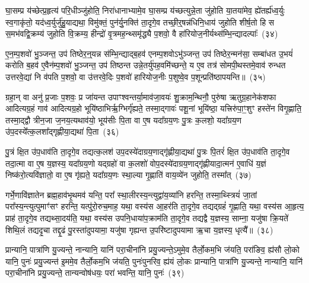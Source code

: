 घा॒सम्प्र य॑च्छेत्प्र॒हृत्य॑ परि॒धीञ्जु॑होति॒ निरा॑धानाभ्यामे॒व घा॒सम्प्र य॑च्छत्युन्ने॒ता जु॑होति या॒तया॑मेव॒ ह्ये॑तर्\mbox{}ह्य॑ध्व॒र्युः स्व॒गाकृ॑तो॒ यद॑ध्व॒र्युर्जु॑हु॒याद्यथा॒ विमु॑क्तं॒ पुन॑र्यु॒नक्ति॑ ता॒दृगे॒व तच्छी॒र्॒\mbox{}षन्न॑धिनि॒धाय॑ जुहोति शीर्\mbox{}ष॒तो हि स स॒मभ॑वद्वि॒क्रम्य॑ जुहोति वि॒क्रम्य॒ हीन्द्रो॑ वृ॒त्रमह॒न्थ्समृ॑द्ध्यै प॒शवो॒ वै हा॑रियोज॒नीर्यथ्स॑म्भि॒न्द्यादल्पाः᳚~(३४)

ए॒न॒म्प॒शवो॑ भु॒ञ्जन्त॒ उप॑ तिष्ठेर॒न्॒यन्न स॑म्भि॒न्द्याद्ब॒हव॑ एनम्प॒शवो\-ऽभु॑ञ्जन्त॒ उप॑ तिष्ठेर॒न्मन॑सा॒ सम्बा॑धत उ॒भयं॑ करोति ब॒हव॑ ए॒वैन॑म्प॒शवो॑ भु॒ञ्जन्त॒ उप॑ तिष्ठन्त उन्ने॒तर्यु॑पह॒वमि॑च्छन्ते॒ य ए॒व तत्र॑ सोमपी॒थस्तमे॒वाव॑ रुन्धत उत्तरवे॒द्यां नि व॑पति प॒शवो॒ वा उ॑त्तरवे॒दिः प॒शवो॑ हारियोज॒नीः प॒शुष्वे॒व प॒शून्प्रति॑\-ष्ठापयन्ति॥~(३५)

{\anuvakamend[{अ॒श्री॒णा॒द॒न्तरा॑धानाभ्या॒मल्पाः᳚ स्थापयन्ति}]}%

ग्रहा॒न् वा अनु॑ प्र॒जाः प॒शवः॒ प्र जा॑यन्त उपाꣳश्वन्तर्या॒माव॑जा॒वयः॑ शु॒क्राम॒न्थिनौ॒ पुरु॑षा ऋतुग्र॒हानेक॑शफा आदित्यग्र॒हं गाव॑ आदित्यग्र॒हो भूयि॑ष्ठाभिर्\mbox{}ऋ॒ग्भिर्गृ॑ह्यते॒ तस्मा॒द्गावः॑ पशू॒नां भूयि॑ष्ठा॒ यत्त्रिरु॑पा॒ꣳ॒शुꣳ हस्ते॑न विगृ॒ह्णाति॒ तस्मा॒द्द्वौ त्रीन॒जा ज॒नय॒त्यथाव॑यो॒ भूय॑सीः पि॒ता वा ए॒ष यदा᳚ग्रय॒णः पु॒त्रः क॒लशो॒ यदा᳚ग्रय॒ण उ॑प॒दस्ये᳚त्क॒लशा᳚द्गृह्णीया॒द्यथा॑ पि॒ता~(३६)

पु॒त्रं क्षि॒त उ॑प॒धाव॑ति ता॒दृगे॒व तद्यत्क॒लश॑ उप॒दस्ये॑दाग्रय॒णाद्गृ॑ह्णीया॒द्यथा॑ पु॒त्रः पि॒तरं॑ क्षि॒त उ॑प॒धाव॑ति ता॒दृगे॒व तदा॒त्मा वा ए॒ष य॒ज्ञस्य॒ यदा᳚ग्रय॒णो यद्ग्रहो॑ वा क॒लशो॑ वोप॒दस्ये॑दाग्रय॒णाद्गृ॑ह्णीयादा॒त्मन॑ ए॒वाधि॑ य॒ज्ञं निष्क॑रो॒त्यवि॑ज्ञातो॒ वा ए॒ष गृ॑ह्यते॒ यदा᳚ग्रय॒णः स्था॒ल्या गृ॒ह्णाति॑ वाय॒व्ये॑न जुहोति॒ तस्मा᳚त्~(३७)

गर्भे॒णावि॑ज्ञातेन ब्रह्म॒हाव॑भृ॒थमव॑ यन्ति॒ परा᳚ स्था॒लीरस्य॒न्त्युद्वा॑य॒व्या॑नि हरन्ति॒ तस्मा॒थ्स्त्रियं॑ जा॒तां परा᳚स्य॒न्त्यु\-त्पुमाꣳ॑सꣳ हरन्ति॒ यत्पु॑रो॒रुच॒माह॒ यथा॒ वस्य॑स आ॒हर॑ति ता॒दृगे॒व तद्यद्ग्रहं॑ गृ॒ह्णाति॒ यथा॒ वस्य॑स आ॒हृत्य॒ प्राह॑ ता॒दृगे॒व तद्यथ्सा॒दय॑ति॒ यथा॒ वस्य॑स उपनि॒धाया॑प॒क्राम॑ति ता॒दृगे॒व तद्यद्वै य॒ज्ञस्य॒ साम्ना॒ यजु॑षा क्रि॒यते॑ शिथि॒लं तद्यदृ॒चा तद्दृ॒ढं पु॒रस्ता॑दुपयामा॒ यजु॑षा गृह्यन्त उ॒परि॑ष्टादुपयामा ऋ॒चा य॒ज्ञस्य॒ धृत्यै᳚॥~(३८)

{\anuvakamend[{यथा॑ पि॒ता तस्मा॑दप॒क्राम॑ति ता॒दृगे॒व तद्यद॒ष्टाद॑श च}]}%

प्रान्यानि॒ पात्रा॑णि यु॒ज्यन्ते॒ नान्यानि॒ यानि॑ परा॒चीना॑नि प्रयु॒ज्यन्ते॒\-ऽमुमे॒व तैर्लो॒कम॒भि ज॑यति॒ परा॑ङिव॒ ह्य॑सौ लो॒को यानि॒ पुनः॑ प्रयु॒ज्यन्त॑ इ॒ममे॒व तैर्लो॒कम॒भि ज॑यति॒ पुनः॑पुनरिव॒ ह्य॑यं लो॒कः प्रान्यानि॒ पात्रा॑णि यु॒ज्यन्ते॒ नान्यानि॒ यानि॑ परा॒चीना॑नि प्रयु॒ज्यन्ते॒ तान्यन्वोष॑धयः॒ परा॑ भवन्ति॒ यानि॒ पुनः॑~(३९)

